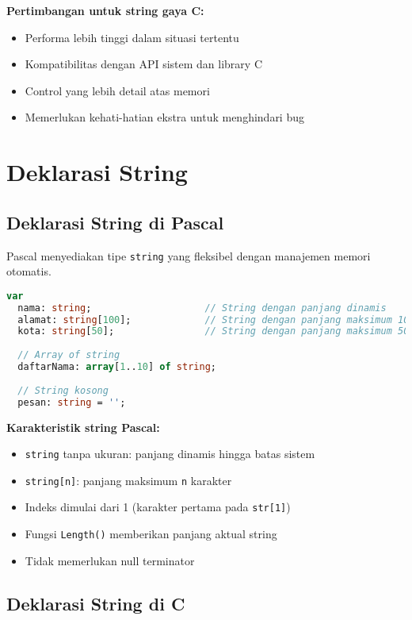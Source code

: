 \documentclass[../main.tex]{subfiles}
\begin{document}
\textbf{Pertimbangan untuk string gaya C:}
\begin{itemize}
  \item Performa lebih tinggi dalam situasi tertentu
  \item Kompatibilitas dengan API sistem dan library C
  \item Control yang lebih detail atas memori
  \item Memerlukan kehati-hatian ekstra untuk menghindari bug
\end{itemize}

\section{Deklarasi String}

\subsection{Deklarasi String di Pascal}

Pascal menyediakan tipe \texttt{string} yang fleksibel dengan manajemen memori otomatis.

\begin{lstlisting}[language=Pascal, caption={Deklarasi string di Pascal}]
var
  nama: string;                    // String dengan panjang dinamis
  alamat: string[100];             // String dengan panjang maksimum 100
  kota: string[50];                // String dengan panjang maksimum 50
  
  // Array of string
  daftarNama: array[1..10] of string;
  
  // String kosong
  pesan: string = '';
\end{lstlisting}

\textbf{Karakteristik string Pascal:}
\begin{itemize}
  \item \texttt{string} tanpa ukuran: panjang dinamis hingga batas sistem
  \item \texttt{string[n]}: panjang maksimum \texttt{n} karakter
  \item Indeks dimulai dari 1 (karakter pertama pada \texttt{str[1]})
  \item Fungsi \texttt{Length()} memberikan panjang aktual string
  \item Tidak memerlukan null terminator
\end{itemize}

\subsection{Deklarasi String di C}
\end{document}
